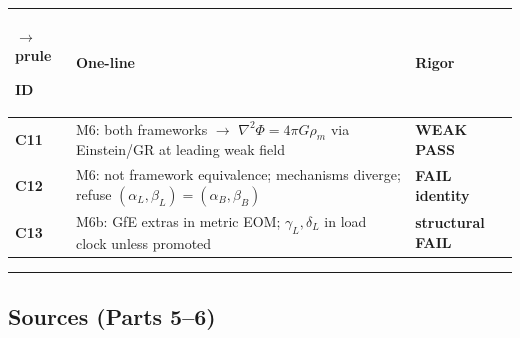 \documentclass[
  11pt,
]{article}
\newcounter{none} %
\begin{document}
{\def\LTcaptype{none} %
\begin{longtable}[]{@{}
  >{\raggedright\arraybackslash}p{}
  >{\raggedright\arraybackslash}p{}
  >{\raggedright\arraybackslash}p{}@{}}
$\rightarrow$prule\noalign{}
\begin{minipage}[b]{\linewidth}\raggedright
ID
\end{minipage} & \begin{minipage}[b]{\linewidth}\raggedright
One-line
\end{minipage} & \begin{minipage}[b]{\linewidth}\raggedright
Rigor
\end{minipage} \\
\midrule\noalign{}
\endhead
\bottomrule\noalign{}
\endlastfoot
\textbf{C11} & M6: both frameworks $\rightarrow$ \(\nabla^2\Phi=4\pi G\rho_m\) via Einstein/GR at leading weak field & \textbf{WEAK PASS} \\
\textbf{C12} & M6: not framework equivalence; mechanisms diverge; refuse \((\alpha_L,\beta_L)=(\alpha_B,\beta_B)\) & \textbf{FAIL identity} \\
\textbf{C13} & M6b: GfE extras in metric EOM; \(\gamma_L,\delta_L\) in load clock unless promoted & \textbf{structural FAIL} \\
\end{longtable}
}

\begin{center}\rule{0.5\linewidth}{0.5pt}\end{center}

\subsection{Sources (Parts 5--6)}\label{sources-parts-56}
\end{document}
